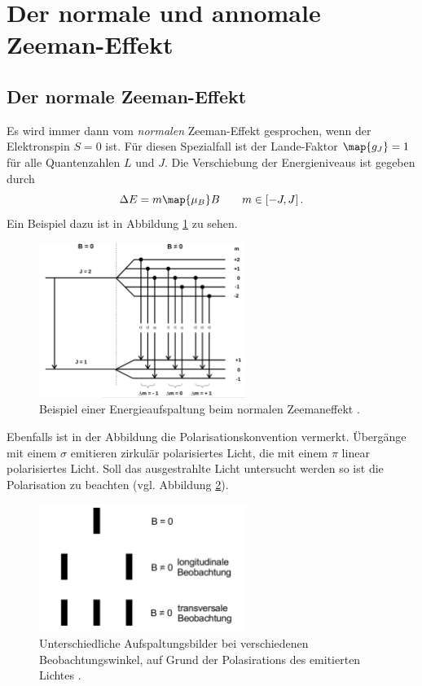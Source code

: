 \section{Der normale und annomale Zeeman-Effekt}

\subsection{Der normale Zeeman-Effekt}
Es wird immer dann vom \emph{normalen} Zeeman-Effekt gesprochen, wenn der Elektronspin $S=0$ ist.
Für diesen Spezialfall ist der Lande-Faktor $\map{g_J}=1$ für alle Quantenzahlen $L$ und $J$.
Die Verschiebung der Energieniveaus ist gegeben durch
\begin{equation}
  \label{eq: energie_normaler_zeeman}
  \Delta E=m\map{\mu_B}B \qquad m\in\left[-J,J\right].
\end{equation}
Ein Beispiel dazu ist in Abbildung \ref{fig: energie_normaler_zeeman} zu sehen.

\begin{figure}[h]
  \centering
  \includegraphics[width=0.6\textwidth]{pics/enerieaufspaltung_normaler_zeeman.png}
  \caption{Beispiel einer Energieaufspaltung beim normalen Zeemaneffekt \cite{anleitung27}.}
  \label{fig: energie_normaler_zeeman}
\end{figure}
Ebenfalls ist in der Abbildung die Polarisationskonvention vermerkt.
Übergänge mit einem $\sigma$ emitieren zirkulär polarisiertes Licht, die mit einem
$\pi$ linear polarisiertes Licht. Soll das ausgestrahlte Licht untersucht werden so ist die Polarisation zu beachten (vgl. Abbildung \ref{fig: beobachtung_energie}).

\begin{figure}[h]
  \centering
  \includegraphics[width=0.6\textwidth]{pics/beobachtung_energie.png}
  \caption{Unterschiedliche Aufspaltungsbilder bei verschiedenen Beobachtungswinkel, auf Grund der Polasirations des emitierten Lichtes \cite{anleitung27}.}
  \label{fig: beobachtung_energie}
\end{figure}

